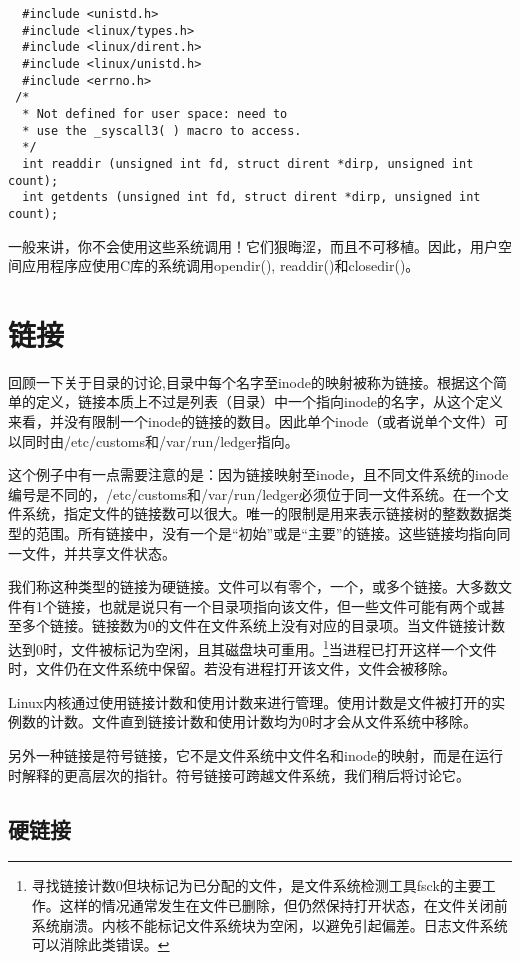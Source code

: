 \begin{lstlisting}
  #include <unistd.h>
  #include <linux/types.h>
  #include <linux/dirent.h>
  #include <linux/unistd.h>
  #include <errno.h>
 /*
  * Not defined for user space: need to
  * use the _syscall3( ) macro to access.
  */
  int readdir (unsigned int fd, struct dirent *dirp, unsigned int count);
  int getdents (unsigned int fd, struct dirent *dirp, unsigned int count);
\end{lstlisting}

一般来讲，你不会使用这些系统调用！它们狠晦涩，而且不可移植。因此，用户空间应用程序应使用C库的系统调用opendir(), readdir()和closedir()。

\section{链接}

回顾一下关于目录的讨论,目录中每个名字至inode的映射被称为链接。根据这个简单的定义，链接本质上不过是列表（目录）中一个指向inode的名字，从这个定义来看，并没有限制一个inode的链接的数目。因此单个inode（或者说单个文件）可以同时由/etc/customs和/var/run/ledger指向。

这个例子中有一点需要注意的是：因为链接映射至inode，且不同文件系统的inode编号是不同的，/etc/customs和/var/run/ledger必须位于同一文件系统。在一个文件系统，指定文件的链接数可以很大。唯一的限制是用来表示链接树的整数数据类型的范围。所有链接中，没有一个是“初始”或是“主要”的链接。这些链接均指向同一文件，并共享文件状态。

我们称这种类型的链接为硬链接。文件可以有零个，一个，或多个链接。大多数文件有1个链接，也就是说只有一个目录项指向该文件，但一些文件可能有两个或甚至多个链接。链接数为0的文件在文件系统上没有对应的目录项。当文件链接计数达到0时，文件被标记为空闲，且其磁盘块可重用。\footnote[1]{寻找链接计数0但块标记为已分配的文件，是文件系统检测工具fsck的主要工作。这样的情况通常发生在文件已删除，但仍然保持打开状态，在文件关闭前系统崩溃。内核不能标记文件系统块为空闲，以避免引起偏差。日志文件系统可以消除此类错误。}当进程已打开这样一个文件时，文件仍在文件系统中保留。若没有进程打开该文件，文件会被移除。

Linux内核通过使用链接计数和使用计数来进行管理。使用计数是文件被打开的实例数的计数。文件直到链接计数和使用计数均为0时才会从文件系统中移除。

另外一种链接是符号链接，它不是文件系统中文件名和inode的映射，而是在运行时解释的更高层次的指针。符号链接可跨越文件系统，我们稍后将讨论它。

\subsection{硬链接}

